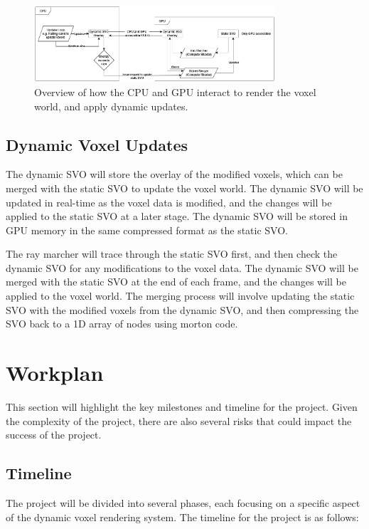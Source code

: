 \documentclass{article}
\begin{document}
\begin{figure}[thp]
    \begin{center}
        \includegraphics[width=0.8\textwidth]{figures/graphical_pipeline.png}
    \end{center}
    \caption{Overview of how the CPU and GPU interact to render the voxel world, and apply dynamic updates.}
    \label{fig:graphical_pipeline}
\end{figure}

\subsection{Dynamic Voxel Updates}
The dynamic SVO will store the overlay of the modified voxels, which can be merged with the static SVO to update the voxel world. The dynamic SVO will be updated in real-time as the voxel data is modified, and the changes will be applied to the static SVO at a later stage. The dynamic SVO will be stored in GPU memory in the same compressed format as the static SVO.

The ray marcher will trace through the static SVO first, and then check the dynamic SVO for any modifications to the voxel data. The dynamic SVO will be merged with the static SVO at the end of each frame, and the changes will be applied to the voxel world. The merging process will involve updating the static SVO with the modified voxels from the dynamic SVO, and then compressing the SVO back to a 1D array of nodes using morton code.

\section{Workplan}
This section will highlight the key milestones and timeline for the project. Given the complexity of the project, there are also several risks that could impact the success of the project.

\subsection{Timeline}
The project will be divided into several phases, each focusing on a specific aspect of the dynamic voxel rendering system. The timeline for the project is as follows:
\end{document}
